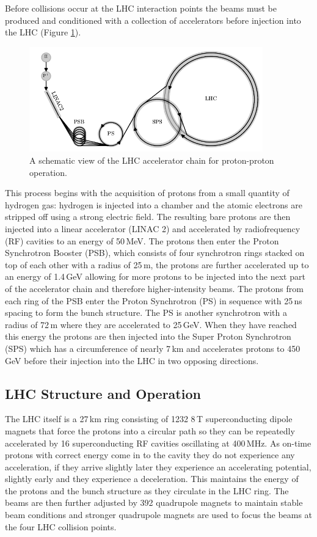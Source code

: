 Before collisions occur at the LHC interaction points the beams must be produced and conditioned with a collection of accelerators \cite{CERN_accelerator_complex} before injection into the LHC (Figure \ref{fig:apparatus:lhc_chain}).
\begin{figure}[h!]
    \includegraphics[width=0.9\textwidth]{figures/apparatus/accel_chain.pdf}
    \caption{A schematic view of the LHC accelerator chain for proton-proton operation.}
    \label{fig:apparatus:lhc_chain}
\end{figure}
This process begins with the acquisition of protons from a small quantity of hydrogen gas: hydrogen is injected into a chamber and the atomic electrons are stripped off using a strong electric field. The resulting bare protons are then injected into a linear accelerator (LINAC 2) and accelerated by radiofrequency (RF) cavities to an energy of 50\,MeV. The protons then enter the Proton Synchrotron Booster (PSB), which consists of four synchrotron rings stacked on top of each other with a radius of 25\,m, the protons are further accelerated up to an energy of 1.4\,GeV allowing for more protons to be injected into the next part of the accelerator chain and therefore higher-intensity beams.
The protons from each ring of the PSB enter the Proton Synchrotron (PS) in sequence with 25\,ns spacing to form the bunch structure. The PS is another synchrotron with a radius of 72\,m where they are accelerated to 25\,GeV. 
When they have reached this energy the protons are then injected into the Super Proton Synchrotron (SPS) which has a circumference of nearly 7\,km and accelerates protons to 450\,GeV before their injection into the LHC in two opposing directions. 


\subsection{LHC Structure and Operation}
The LHC itself is a 27\,km ring consisting of 1232 8\,T superconducting dipole magnets that force the protons into a circular path so they can be repeatedly accelerated by 16 superconducting RF cavities oscillating at 400\,MHz. As on-time protons with correct energy come in to the cavity they do not experience any acceleration, if they arrive slightly later they experience an accelerating potential, slightly early and they experience a deceleration. This maintains the energy of the protons and the bunch structure as they circulate in the LHC ring. The beams are then further adjusted by 392 quadrupole magnets to maintain stable beam conditions and stronger quadrupole magnets are used to focus the beams at the four LHC collision points.

